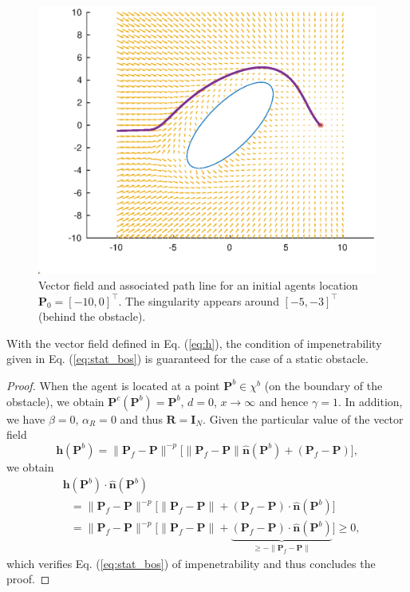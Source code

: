 \begin{figure}[h]
  \centering
  \includegraphics[width=0.8\linewidth]{img/CAVF_double_integrator_2D.eps}
  \caption{Vector field and associated path line for an initial agents location $\bm{P}_0 = [-10,0]^\top$. The singularity appears around $[-5,-3]^\top$ (behind the obstacle).}
  \label{fig:path_sing}
\end{figure}

\begin{proposition} \label{prop:imp_stat}
With the vector field defined in Eq. (\ref{eq:h}), the condition of impenetrability given in Eq. (\ref{eq:stat_bos}) is guaranteed for the case of a static obstacle.
\end{proposition}
\begin{proof}
When the agent is located at a point $\bm{P}^b \in \chi^b$ (on the boundary of the obstacle), we obtain $\bm{P}^c(\bm{P}^b) = \bm{P}^b$, $d = 0$, $x  \rightarrow \infty$ and hence $\gamma = 1$. In addition, we have $\beta = 0$, $\alpha_R = 0$ and thus $\bm{R} = \bm{I}_N$. Given the particular value of the vector field
\[
    \bm{h}(\bm{P}^b) =  \|\bm{P}_f - \bm{P}\|^{-p} \Big[ \|\bm{P}_f - \bm{P}\| \hat{\bm{n}}(\bm{P}^b) + (\bm{P}_f - \bm{P}) \Big],
\]
we obtain
\begin{align*}
    & \bm{h}(\bm{P}^b) \cdot \hat{\bm{n}}(\bm{P}^b)  \\ &~~~=\|\bm{P}_f - \bm{P}\|^{-p} \Big[ \|\bm{P}_f - \bm{P}\| + (\bm{P}_f - \bm{P}) \cdot \hat{\bm{n}}(\bm{P}^b) \Big] \\
    &~~~=  \|\bm{P}_f - \bm{P}\|^{-p} \Big[ \|\bm{P}_f - \bm{P}\| + \underbrace{(\bm{P}_f - \bm{P}) \cdot \hat{\bm{n}}(\bm{P}^b)}_{\ge -\|\bm{P}_f - \bm{P}\|} \Big] \ge 0,
\end{align*}
which verifies Eq. (\ref{eq:stat_bos}) of impenetrability and thus concludes the proof.
\end{proof}

